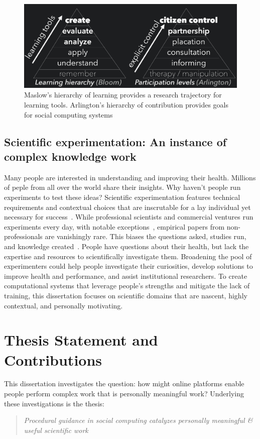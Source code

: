 \begin{figure}[!h] 
  \centering
 \includegraphics[width=1.0\textwidth]{figures/intro/intro-taxonomy}
  \caption[Maslow's hierarchy of learning and Arlington's hierarchy of contribution]
{Maslow's hierarchy of learning provides a research trajectory for learning tools. Arlington's hierarchy of contribution provides goals for social computing systems}
  \label{fig:intro-taxonomy}
\end{figure}

\subsection{Scientific experimentation: An instance of complex knowledge work}
Many people are interested in understanding and improving their health. Millions of peple from all over the world share their insights. 
Why haven't people run experiments to test these ideas? Scientific experimentation features technical requirements and contextual choices 
that are inscrutable for a lay individual yet necessary for success~\cite{Martin2007}. While 
professional scientists and commercial ventures run experiments every day, with 
notable exceptions~\cite{Cooper2010,DanaLewis}, empirical papers from non-professionals are 
vanishingly rare. This biases the questions asked, studies run, and knowledge 
created~\cite{Henrich2010a}. People have questions about their health, but lack the expertise 
and resources to scientifically investigate them. Broadening the pool of 
experimenters could help people investigate their curiosities, develop solutions 
to improve health and performance, and assist institutional researchers. To create computational systems that leverage people's strengths and mitigate the lack of training, this dissertation focuses on scientific domains that are nascent, highly contextual, and personally motivating.

\section{Thesis Statement and Contributions}
This dissertation investigates the question: how might online platforms enable people perform 
complex work that is personally meaningful work? Underlying these investigations is the thesis:\\
\begin{quote}
\emph{Procedural guidance in social computing catalyzes personally meaningful \& useful scientific work}
\end{quote}

